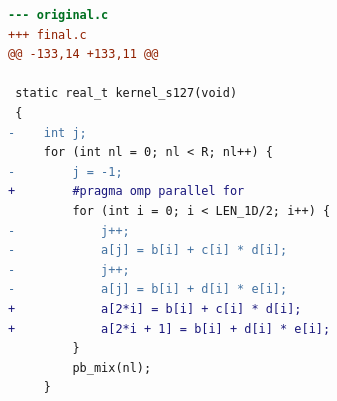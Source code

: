 \begin{lstlisting}[language=diff,basicstyle=\ttfamily\scriptsize,breaklines=true,caption={tsvc/s127 — FASTER (e1_r_a)}]
--- original.c
+++ final.c
@@ -133,14 +133,11 @@
 
 static real_t kernel_s127(void)
 {
-    int j;
     for (int nl = 0; nl < R; nl++) {
-        j = -1;
+        #pragma omp parallel for 
         for (int i = 0; i < LEN_1D/2; i++) {
-            j++;
-            a[j] = b[i] + c[i] * d[i];
-            j++;
-            a[j] = b[i] + d[i] * e[i];
+            a[2*i] = b[i] + c[i] * d[i];
+            a[2*i + 1] = b[i] + d[i] * e[i];
         }
         pb_mix(nl);
     }
\end{lstlisting}
